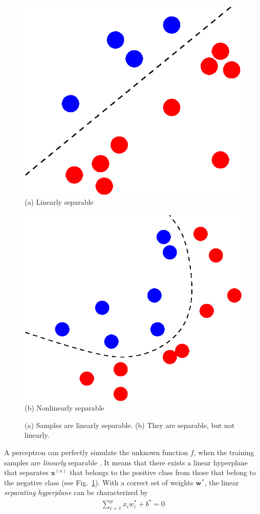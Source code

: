 \documentclass[dissertation,nocontribution,draft*]{aaltoseries}
\newcommand{\vect}[1]{\mathbf{#1}}
\newcommand{\vx}[0]{\vect{x}}
\newcommand{\vw}[0]{\vect{w}}
\begin{document}
\begin{figure}[t]
    \begin{minipage}{0.48\textwidth}
        \centering
        \includegraphics[width=0.75\columnwidth]{figures/linsep.eps}
        \\
        \small
        (a) Linearly separable
    \end{minipage}
    \begin{minipage}{0.48\textwidth}
        \centering
        \includegraphics[width=0.75\columnwidth]{figures/nonlinsep.eps}
        \\
        \small
        (b) Nonlinearly separable
    \end{minipage}
    \caption{(a)
    Samples are linearly separable. (b) They are separable,
    but not linearly.}
    \label{fig:linsep}
\end{figure}

A perceptron can perfectly simulate the unknown function
$f$, when the training samples are \textit{linearly}
separable \citep{Minsky1969}.  It means that
there exists a linear hyperplane that separates $\vx^{(n)}$
that belongs to the positive class from those that belong to
the negative class (see Fig.~\ref{fig:linsep}). With a
correct set of weights $\vw^*$, the linear
\textit{separating hyperplane} can be characterized by
\begin{align*}
    \sum_{i=1}^p x_i w_i^* + b^* = 0
\end{align*}
\end{document}
